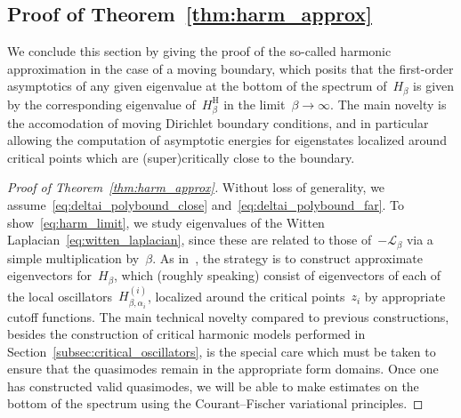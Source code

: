 \documentclass[10pt]{article}
\newcommand{\cL}{\mathcal{L}}
\newcommand{\1}{\mathbbm 1}
\begin{document}
    \subsection{Proof of Theorem~\ref{thm:harm_approx}}
    We conclude this section by giving the proof of the so-called harmonic approximation in the case of a moving boundary, which posits that the first-order asymptotics of any given eigenvalue at the bottom of the spectrum of~$H_\beta$ is given by the corresponding eigenvalue of~$H_\beta^{\mathrm H}$ in the limit~$\beta\to\infty$.
    The main novelty is the accomodation of moving Dirichlet boundary conditions, and in particular allowing the computation of asymptotic energies for eigenstates localized around critical points which are (super)critically close to the boundary.

    \begin{proof}[Proof of Theorem~\ref{thm:harm_approx}]
        Without loss of generality, we assume~\eqref{eq:deltai_polybound_close} and~\eqref{eq:deltai_polybound_far}.
        To show~\eqref{eq:harm_limit}, we study eigenvalues of the Witten Laplacian~\eqref{eq:witten_laplacian}, since these are related to those of~$-\cL_\beta$ via a simple multiplication by~$\beta$.
        As in~\cite{S83}, the strategy is to construct approximate eigenvectors for~$H_\beta$, which (roughly speaking) consist of eigenvectors of each of the local oscillators~$H_{\beta,\alpha_i}^{(i)}$, localized around the critical points~$z_i$ by appropriate cutoff functions.
        The main technical novelty compared to previous constructions, besides the construction of critical harmonic models performed in Section~\ref{subsec:critical_oscillators}, is the special care which must be taken to ensure that the quasimodes remain in the appropriate form domains. Once one has constructed valid quasimodes, we will be able to make estimates on the bottom of the spectrum using the Courant--Fischer variational principles.


\end{proof}
\end{document}

